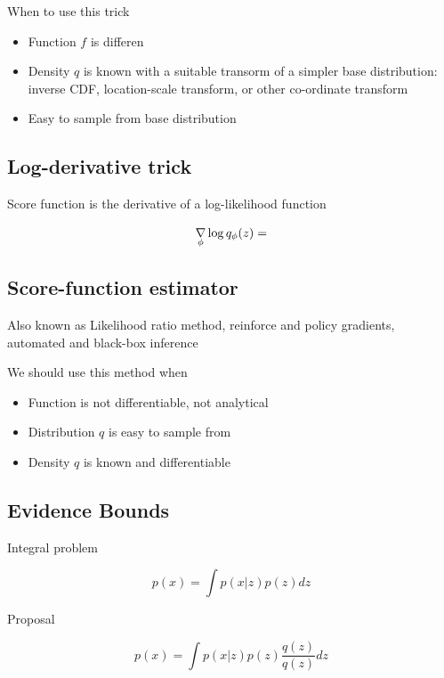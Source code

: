\documentclass[b5paper]{report}
\begin{document}
When to use this trick

\begin{itemize}
  \item Function $f$ is differen
  \item Density $q$ is known with a suitable transorm of a simpler base
      distribution: inverse CDF, location-scale transform, or other co-ordinate
      transform
  \item Easy to sample from base distribution
\end{itemize}

\subsection{Log-derivative trick}

Score function is the derivative of a log-likelihood function

\begin{equation}
  \operatorname*{\nabla}_\phi \log q_\phi(z) =
\end{equation}

\subsection{Score-function estimator}

Also known as Likelihood ratio method, reinforce and policy gradients,
automated and black-box inference

We should use this method when

\begin{itemize}
  \item Function is not differentiable, not analytical
  \item Distribution $q$ is easy to sample from
  \item Density $q$ is known and differentiable
\end{itemize}

\subsection{Evidence Bounds}

Integral problem

\begin{equation}
  p(x) = \int p(x|z)p(z) dz
\end{equation}

Proposal

\begin{equation}
  p(x) = \int p(x|z)p(z) \frac{q(z)}{q(z)} dz
\end{equation}
\end{document}
